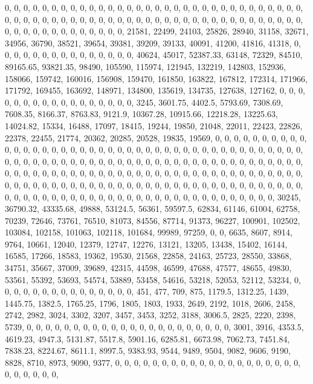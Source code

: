 \documentclass[
]{article}
\begin{document}
0, 0, 0, 0, 0, 0, 0, 0, 0, 0, 0, 0, 0, 0, 0, 0, 0, 0, 0, 0, 0, 0, 0, 0,
0, 0, 0, 0, 0, 0, 0, 0, 0, 0, 0, 0, 0, 0, 0, 0, 0, 0, 0, 0, 0, 0, 0, 0,
0, 0, 0, 0, 0, 0, 0, 0, 0, 0, 0, 0, 0, 0, 0, 0, 0, 0, 0, 0, 0, 0, 0, 0,
0, 0, 0, 0, 0, 21581, 22499, 24103, 25826, 28940, 31158, 32671, 34956,
36790, 38521, 39654, 39381, 39209, 39133, 40091, 41200, 41816, 41318, 0,
0, 0, 0, 0, 0, 0, 0, 0, 0, 0, 0, 0, 0, 0, 40624, 45017, 52387.33, 63148,
72329, 84510, 89165.65, 93821.35, 98490, 105590, 115974, 121945, 132219,
142803, 152936, 158066, 159742, 160016, 156908, 159470, 161850, 163822,
167812, 172314, 171966, 171792, 169455, 163692, 148971, 134800, 135619,
134735, 127638, 127162, 0, 0, 0, 0, 0, 0, 0, 0, 0, 0, 0, 0, 0, 0, 0, 0,
0, 3245, 3601.75, 4402.5, 5793.69, 7308.69, 7608.35, 8166.37, 8763.83,
9121.9, 10367.28, 10915.66, 12218.28, 13225.63, 14024.82, 15334, 16488,
17097, 18415, 19244, 19850, 21048, 22011, 22423, 22826, 22378, 22455,
21774, 20362, 20285, 20528, 19835, 19569, 0, 0, 0, 0, 0, 0, 0, 0, 0, 0,
0, 0, 0, 0, 0, 0, 0, 0, 0, 0, 0, 0, 0, 0, 0, 0, 0, 0, 0, 0, 0, 0, 0, 0,
0, 0, 0, 0, 0, 0, 0, 0, 0, 0, 0, 0, 0, 0, 0, 0, 0, 0, 0, 0, 0, 0, 0, 0,
0, 0, 0, 0, 0, 0, 0, 0, 0, 0, 0, 0, 0, 0, 0, 0, 0, 0, 0, 0, 0, 0, 0, 0,
0, 0, 0, 0, 0, 0, 0, 0, 0, 0, 0, 0, 0, 0, 0, 0, 0, 0, 0, 0, 0, 0, 0, 0,
0, 0, 0, 0, 0, 0, 0, 0, 0, 0, 0, 0, 0, 0, 0, 0, 0, 0, 0, 0, 0, 0, 0, 0,
0, 0, 0, 0, 0, 0, 0, 0, 0, 0, 0, 0, 0, 0, 0, 0, 0, 0, 0, 0, 0, 0, 0, 0,
0, 0, 0, 0, 0, 0, 0, 0, 0, 0, 0, 0, 0, 30245, 36790.32, 43335.68, 49888,
53124.5, 56361, 59597.5, 62834, 61146, 61004, 62758, 70239, 72646,
73761, 76510, 81073, 84556, 87714, 91373, 96227, 100901, 102502, 103084,
102158, 101063, 102118, 101684, 99989, 97259, 0, 0, 6635, 8607, 8914,
9764, 10661, 12040, 12379, 12747, 12276, 13121, 13205, 13438, 15402,
16144, 16585, 17266, 18583, 19362, 19530, 21568, 22858, 24163, 25723,
28550, 33868, 34751, 35667, 37009, 39689, 42315, 44598, 46599, 47688,
47577, 48655, 49830, 53561, 55392, 53693, 54574, 53889, 53458, 54616,
53218, 52053, 52112, 53234, 0, 0, 0, 0, 0, 0, 0, 0, 0, 0, 0, 0, 0, 0, 0,
451, 477, 709, 875, 1179.5, 1312.25, 1439, 1445.75, 1382.5, 1765.25,
1796, 1805, 1803, 1933, 2649, 2192, 1018, 2606, 2458, 2742, 2982, 3024,
3302, 3207, 3457, 3453, 3252, 3188, 3006.5, 2825, 2220, 2398, 5739, 0,
0, 0, 0, 0, 0, 0, 0, 0, 0, 0, 0, 0, 0, 0, 0, 0, 0, 0, 0, 0, 0, 3001,
3916, 4353.5, 4619.23, 4947.3, 5131.87, 5517.8, 5901.16, 6285.81,
6673.98, 7062.73, 7451.84, 7838.23, 8224.67, 8611.1, 8997.5, 9383.93,
9544, 9489, 9504, 9082, 9606, 9190, 8828, 8710, 8973, 9090, 9377, 0, 0,
0, 0, 0, 0, 0, 0, 0, 0, 0, 0, 0, 0, 0, 0, 0, 0, 0, 0, 0, 0, 0, 0, 0, 0,
\end{document}
